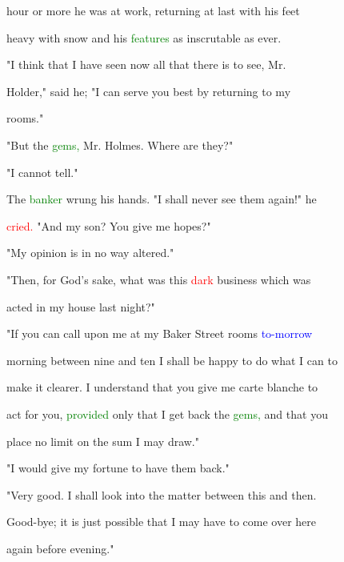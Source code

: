  hour or more he was at work, returning at last with his feet

 heavy with snow and his \textcolor{green}{features} as inscrutable as ever.



 "I think that I have seen now all that there is to see, Mr.

 Holder," said he; "I can \textcolor{BurntOrange}{serve} you best by returning to my

 rooms."



 "But the \textcolor{green}{gems,} Mr. Holmes. Where are they?"



 "I cannot tell."



 The \textcolor{green}{banker} wrung his hands. "I shall never see them again!" he

 \textcolor{red}{cried.} "And my son? You give me \textcolor{BurntOrange}{hopes?"}



 "My opinion is in no way altered."



 "Then, for \textcolor{BurntOrange}{God's} sake, what was this \textcolor{red}{dark} business which was

 acted in my house last night?"



 "If you can call upon me at my Baker Street rooms \textcolor{blue}{to-morrow}

 morning between nine and ten I shall be \textcolor{BurntOrange}{happy} to do what I can to

 make it clearer. I understand that you give me carte blanche to

 act for you, \textcolor{green}{provided} only that I get back the \textcolor{green}{gems,} and that you

 place no limit on the sum I may draw."



 "I would give my \textcolor{BurntOrange}{fortune} to have them back."



 "Very \textcolor{BurntOrange}{good.} I shall look into the matter between this and then.

 Good-bye; it is just possible that I may have to come over here

 again before evening."



